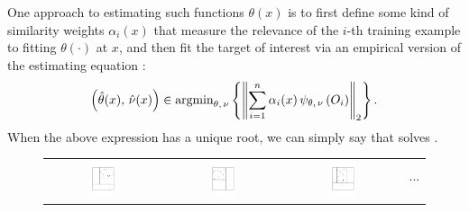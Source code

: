 \documentclass[aos]{imsart}
\theoremstyle{plain}
\theoremstyle{definition}
\theoremstyle{remark}
\begin{document}
\begin{CJK}{UTF8}{gbsn}
{One approach to estimating such functions $\theta(x)$ is to first define
some kind of similarity weights $\alpha_i(x)$ that measure the relevance of the $i$-th training example to
fitting $\theta(\cdot)$ at $x$, and then fit the target of interest via an empirical version of
the estimating equation
\citep{fan1998local,newey1994kernel,staniswalis1989kernel,stone1977consistent,tibshirani1987local}:
\begin{equation}
\label{eq:gee_estimate}
\p{\htheta(x), \, \hnu(x)} \in \argmin_{\theta, \, \nu} \cb{\Norm{\sum_{i = 1}^n \alpha_i(x) \, \psi_{\theta, \, \nu}\p{O_i}}_2}.
\end{equation}
When the above expression has a unique root, we can simply say that 
solves .

\begin{figure}
\begin{center}
\begin{tabular}{cccc}
\includegraphics[width = 0.25\textwidth, trim=15mm 40mm 20mm 40mm, clip = TRUE]{tree_match1.pdf} &
\includegraphics[width = 0.25\textwidth, trim=15mm 40mm 20mm 40mm, clip = TRUE]{tree_match2.pdf} &
\includegraphics[width = 0.25\textwidth, trim=15mm 40mm 20mm 40mm, clip = TRUE]{tree_match3.pdf} &
\parbox[b][0.25\textwidth][c]{0.1\textwidth}{$$\cdots$$}
\end{tabular}


\end{center}
\end{figure}}
\end{CJK}
\end{document}
